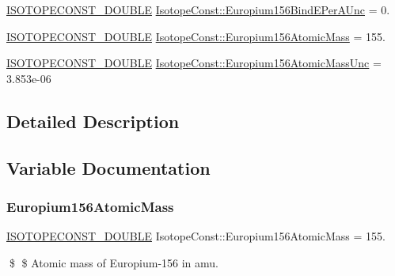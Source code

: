 \begin{DoxyCompactItemize}
\mbox{\hyperlink{group___isotope_const-_macros_ga8f45a7272ce02c0b4c65c44636ed719a}{I\+S\+O\+T\+O\+P\+E\+C\+O\+N\+S\+T\+\_\+\+D\+O\+U\+B\+LE}} \mbox{\hyperlink{group___isotope_const-_europium-_eu156_gabea683d510b699cb36346b1ea2a72c27}{Isotope\+Const\+::\+Europium156\+Bind\+E\+Per\+A\+Unc}} = 0.
\item 
\mbox{\hyperlink{group___isotope_const-_macros_ga8f45a7272ce02c0b4c65c44636ed719a}{I\+S\+O\+T\+O\+P\+E\+C\+O\+N\+S\+T\+\_\+\+D\+O\+U\+B\+LE}} \mbox{\hyperlink{group___isotope_const-_europium-_eu156_ga7b74143ff523e2340b36d8c4f1168207}{Isotope\+Const\+::\+Europium156\+Atomic\+Mass}} = 155.
\item 
\mbox{\hyperlink{group___isotope_const-_macros_ga8f45a7272ce02c0b4c65c44636ed719a}{I\+S\+O\+T\+O\+P\+E\+C\+O\+N\+S\+T\+\_\+\+D\+O\+U\+B\+LE}} \mbox{\hyperlink{group___isotope_const-_europium-_eu156_gaf638afe4deb1a3bfa2b5267cc9854368}{Isotope\+Const\+::\+Europium156\+Atomic\+Mass\+Unc}} = 3.\+853e-\/06
\end{DoxyCompactItemize}


\subsection{Detailed Description}


\subsection{Variable Documentation}
\mbox{\label{group___isotope_const-_europium-_eu156_ga7b74143ff523e2340b36d8c4f1168207}} 
\subsubsection{\texorpdfstring{Europium156\+Atomic\+Mass}{Europium156AtomicMass}}
{\footnotesize\ttfamily \mbox{\hyperlink{group___isotope_const-_macros_ga8f45a7272ce02c0b4c65c44636ed719a}{I\+S\+O\+T\+O\+P\+E\+C\+O\+N\+S\+T\+\_\+\+D\+O\+U\+B\+LE}} Isotope\+Const\+::\+Europium156\+Atomic\+Mass = 155.}

\$ \$ Atomic mass of Europium-\/156 in amu. \mbox{\label{group___isotope_const-_europium-_eu156_gaf638afe4deb1a3bfa2b5267cc9854368}} 
